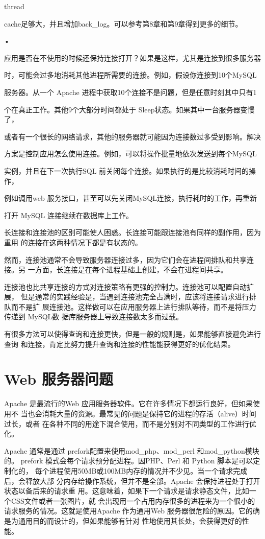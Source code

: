thread

cache足够大，并且增加back\_log。可以参考第8章和第9章得到更多的细节。

•

应用是否在不使用的时候还保持连接打开？如果是这样，尤其是连接到很多服务器

时，可能会过多地消耗其他进程所需要的连接。例如，假设你连接到10个MySQL

服务器。从一个 Apache 进程中获取10个连接不是问题，但是任意时刻其中只有1

个在真正工作。其他9个大部分时间都处于 Sleep状态。如果其中一台服务器变慢了，

或者有一个很长的网络请求，其他的服务器就可能因为连接数过多受到影响。解决

方案是控制应用怎么使用连接。例如，可以将操作批量地依次发送到每个MySQL

实例，并且在下一次执行SQL 前关闭每个连接。如果执行的是比较消耗时间的操作，

例如调用web 服务接口，甚至可以先关闭MySQL连接，执行耗时的工作，再重新

打开 MySQL 连接继续在数据库上工作。

长连接和连接池的区别可能使人困惑。长连接可能跟连接池有同样的副作用，因为重用
的连接在这两种情况下都是有状态的。

然而，连接池通常不会导致服务器连接过多，因为它们会在进程间排队和共享连接。另
一方面，长连接是在每个进程基础上创建，不会在进程间共享。

连接池也比共享连接的方式对连接策略有更强的控制力。连接池可以配置自动扩展，
但是通常的实践经验是，当遇到连接池完全占满时，应该将连接请求进行排队而不是扩
展连接池。这样做可以在应用服务器上进行排队等待，而不是将压力传递到 MySQL数
据库服务器上导致连接数太多而过载。

有很多方法可以使得查询和连接更快，但是一般的规则是，如果能够直接避免进行查询
和连接，肯定比努力提升查询和连接的性能能获得更好的优化结果。

\section{Web 服务器问题}
Apache 是最流行的Web 应用服务器软件。它在许多情况下都运行良好，但如果使用不
当也会消耗大量的资源。最常见的问题是保持它的进程的存活（alive）时间过长，或者
在各种不同的用途下混合使用，而不是分别对不同类型的工作进行优化。

Apache 通常是通过 prefork配置来使用mod\_php、mod\_perl 和mod\_python模块的。
prefork 模式会每个请求预分配进程。因PHP、Perl 和 Python 脚本是可以定制化的，
每个进程使用50MB或100MB内存的情况并不少见。当一个请求完成后，会释放大部
分内存给操作系统，但并不是全部。Apache 会保持进程处于打开状态以备后来的请求重
用。这意味着，如果下一个请求是请求静态文件，比如一个CSS文件或者一张图片，就
会出现用一个占用内存很多的进程来为一个很小的请求服务的情况。这就是使用Apache
作为通用Web 服务器很危险的原因。它的确是为通用目的而设计的，但如果能够有针对
性地使用其长处，会获得更好的性能。

